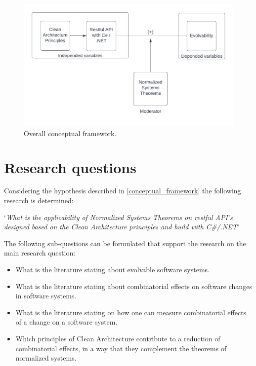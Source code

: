 \begin{figure}[!h]
    \centering
    \includegraphics[width=1\textwidth]{Figures/overall_conceptual_framework}
    \caption[Overall conceptual framework]{Overall conceptual framework.}
    \label{fig:overall_conceptual_framework}
\end{figure}
\newpage
\section{Research questions} \label{research_questions}
Considering the hypothesis described in \ref{conceptual_framework} the following research
is determined:

\begin{center}
    \enquote*{\textit{What is the applicability of Normalized Systems Theorems
    on restful API's designed based on the Clean Architecture principles and build with
    C\#/.NET}}
\end{center}

The following sub-questions can be formulated that support the research on the main
research question:
\begin{itemize}
    \item What is the literature stating about evolvable software systems.
    \item What is the literature stating about combinatorial effects on software changes in software systems.
    \item What is the literature stating on how one can measure combinatorial effects of a change on a software system.
    \item Which principles of Clean Architecture contribute to a reduction of
    combinatorial effects, in a way that they complement the theorems of normalized
    systems.
\end{itemize}